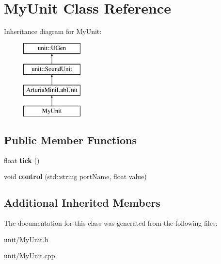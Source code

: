 \hypertarget{classMyUnit}{}\section{My\+Unit Class Reference}
\label{classMyUnit}
Inheritance diagram for My\+Unit\+:\begin{figure}[H]
\begin{center}
\leavevmode
\includegraphics[height=4.000000cm]{classMyUnit}
\end{center}
\end{figure}
\subsection*{Public Member Functions}
\begin{DoxyCompactItemize}
\item 
float {\bfseries tick} ()\hypertarget{classMyUnit_a953579dd3e7fd08821f52c957227b6dc}{}\label{classMyUnit_a953579dd3e7fd08821f52c957227b6dc}

\item 
void {\bfseries control} (std\+::string port\+Name, float value)\hypertarget{classMyUnit_a6124b88dea5a34a74748553757de4357}{}\label{classMyUnit_a6124b88dea5a34a74748553757de4357}

\end{DoxyCompactItemize}
\subsection*{Additional Inherited Members}


The documentation for this class was generated from the following files\+:\begin{DoxyCompactItemize}
\item 
unit/My\+Unit.\+h\item 
unit/My\+Unit.\+cpp\end{DoxyCompactItemize}
